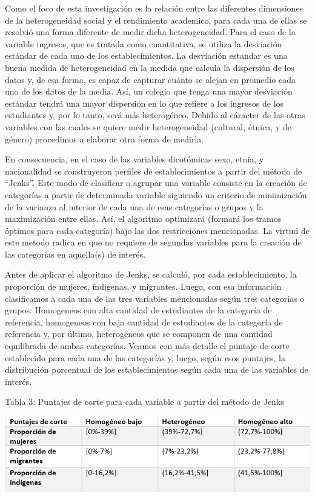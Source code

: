 \documentclass[
]{article}
\begin{document}
Como el foco de esta investigación es la relación entre las diferentes
dimensiones de la heterogeneidad social y el rendimiento academico, para
cada una de ellas se resolvió una forma diferente de medir dicha
heterogeneidad. Para el caso de la variable ingresos, que es tratada
como cuantitativa, se utiliza la desviación estándar de cada uno de los
establecimientos. La desviación estandar es una buena medida de
heterogeneidad en la medida que calcula la dispersión de los datos y, de
esa forma, es capaz de capturar cuánto se alejan en promedio cada uno de
los datos de la media. Así, un colegio que tenga una mayor desviación
estándar tendrá una mayor dispersión en lo que refiere a los ingresos de
los estudiantes y, por lo tanto, será más heterogéneo. Debido al
cáracter de las otras variables con las cuales se quiere medir
heterogeneidad (cultural, étnica, y de género) procedimos a elaborar
otra forma de medirla.

En consecuencia, en el caso de las variables dicotómicas sexo, etnia, y
nacionalidad se construyeron perfiles de establecimientos a partir del
método de ``Jenks''. Este modo de clasificar o agrupar una variable
consiste en la creación de categorías a partir de determinada variable
siguiendo un criterio de minimización de la varianza al interior de cada
una de esas categorías o grupos y la maximización entre ellas. Así, el
algoritmo optimizará (formará los tramos óptimos para cada categoría)
bajo las dos restricciones mencionadas. La virtud de este metodo radica
en que no requiere de segundas variables para la creación de las
categorías en aquella(s) de interés.

Antes de aplicar el algoritmo de Jenks, se calculó, por cada
establecimiento, la proporción de mujeres, índigenas, y migrantes.
Luego, con esa información clasificamos a cada una de las tres variables
mencionadas según tres categorías o grupos: Homogeneos con alta cantidad
de estudiantes de la categoría de referencia, homogeneos con baja
cantidad de estudiantes de la categoría de referencia y, por último,
heterogeneos que se componen de una cantidad equilibrada de ambas
categorías. Veamos con más detalle el puntaje de corte establecido para
cada una de las categorías y, luego, según esos puntajes, la
distribución porcentual de los establecimientos según cada una de las
variables de interés.

Tabla 3: Puntajes de corte para cada variable a partir del método de
Jenks

\includegraphics{input/images/puntajes_de_corte.png}
\end{document}
